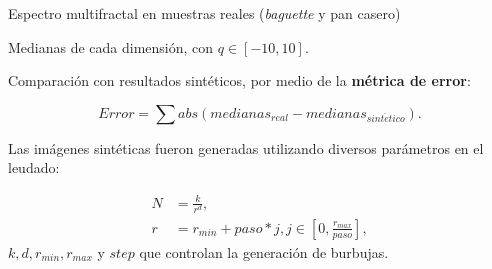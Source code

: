 \documentclass[spanish,unknownkeysallowed]{beamer}
\begin{document}










\begin{frame}
Espectro multifractal en muestras reales ({\em baguette} y pan casero)

Medianas de cada dimensión, con $q \in [-10,10]$.

Comparación con resultados sintéticos, por medio de la \textbf{métrica de error}:

\begin{equation*}
Error = \displaystyle \sum abs(medianas_{real}-medianas_{sint\acute{e}tico}).
\end{equation*}

Las imágenes sintéticas fueron generadas utilizando diversos parámetros en el leudado:

\begin{align*}
N &= \frac{k}{r^{d}},\\ r &= r_{min}+paso*j, j \in [0,\frac{r_{max}}{paso}],
\end{align*}
\noindent $k,d,r_{min},r_{max}$ y $step$ que controlan la generación de burbujas.

\end{frame}
\end{document}
